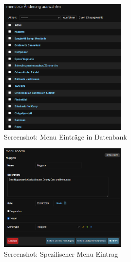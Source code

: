 \begin{figure}[htp]
    \begin{subfigure}[b]{0.5\textwidth}
        \centering
        \includegraphics[width=0.7\textwidth]{images/Resultat-admin-menulist.png}
        \caption{Screenshot: Menu Einträge in Datenbank}
        \label{fig:r-adminpanel-menulist}
    \end{subfigure}
    \begin{subfigure}[b]{0.5\textwidth}
        \centering
        \includegraphics[width=0.7\textwidth]{images/Resultat-admin-menu.png}
        \caption{Screenshot: Spezifischer Menu Eintrag}
        \label{fig:r-adminpanel-menu}
    \end{subfigure}
    \hfill
    \begin{subfigure}[b]{\textwidth}
        \centering

\end{subfigure}
\end{figure}
